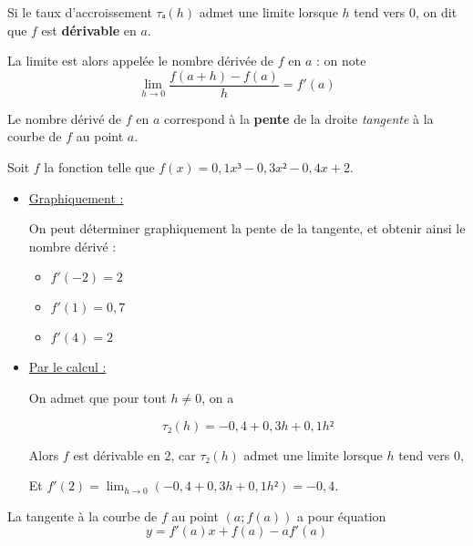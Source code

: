 \documentclass[
	classe=$1^{ere}STI2D$,
	headerTitle=Cours\space Chapitre\space 5
]{coursclass}
\begin{document}
\begin{definition}
	Si le taux d'accroissement $τₐ(h)$ admet une limite lorsque $h$ tend vers $0$, on dit que $f$ est \textbf{dérivable} en $a$.

	La limite est alors appelée le nombre dérivée de $f$ en $a$ : on note
	$$ \lim_{h→0} \dfrac{f(a+h)-f(a)}{h} = f'(a) $$
\end{definition}

\begin{remarque}
	Le nombre dérivé de $f$ en $a$ correspond à la \textbf{pente} de la droite \textit{tangente} à la courbe de $f$ au point $a$.
\end{remarque}

\begin{exemple}
	Soit $f$ la fonction telle que $f(x) = 0,1x³ - 0,3x² - 0,4x + 2$.

	\begin{itemize}
		\item \uline{Graphiquement :}

		      \begin{center}
		      \end{center}

		      On peut déterminer graphiquement la pente de la tangente, et obtenir ainsi le nombre dérivé :
		      \begin{multicols}{3}
			      \begin{itemize}
				      \item $f'(-2) = 2$
				      \item $f'(1) = 0,7$
				      \item $f'(4) = 2$
			      \end{itemize}
		      \end{multicols}
		\item \uline{Par le calcul :}

		      On admet que pour tout $h ≠ 0$, on a

		      $$ τ₂(h) = -0,4 + 0,3h + 0,1h² $$

		      Alors $f$ est dérivable en $2$, car $τ₂(h)$ admet une limite lorsque $h$ tend vers $0$,

		      Et $f'(2) = \lim_{h→0}(-0,4 + 0,3h + 0,1h²) = -0,4$.
	\end{itemize}
\end{exemple}

\begin{propriete}
	La tangente à la courbe de $f$ au point $(a ; f(a))$ a pour équation
	$$ y = f'(a)x + f(a) - af'(a) $$
\end{propriete}
\end{document}
